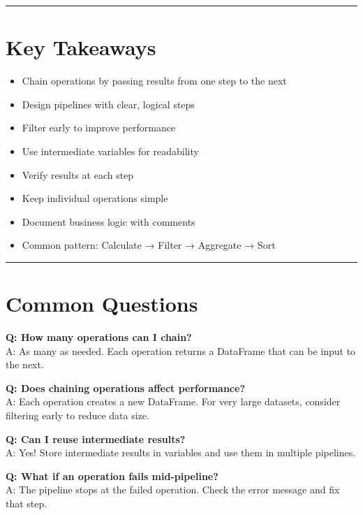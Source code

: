 \documentclass[
  letterpaper,
]{scrbook}
\providecommand{\tightlist}{%
  \setlength{\itemsep}{0pt}\setlength{\parskip}{0pt}}
\begin{document}
\begin{center}\rule{0.5\linewidth}{0.5pt}\end{center}

\section{Key Takeaways}\label{key-takeaways-9}

\begin{itemize}
\tightlist
\item
  Chain operations by passing results from one step to the next
\item
  Design pipelines with clear, logical steps
\item
  Filter early to improve performance
\item
  Use intermediate variables for readability
\item
  Verify results at each step
\item
  Keep individual operations simple
\item
  Document business logic with comments
\item
  Common pattern: Calculate → Filter → Aggregate → Sort
\end{itemize}

\begin{center}\rule{0.5\linewidth}{0.5pt}\end{center}

\section{Common Questions}\label{common-questions-9}

\textbf{Q: How many operations can I chain?}\\
A: As many as needed. Each operation returns a DataFrame that can be
input to the next.

\textbf{Q: Does chaining operations affect performance?}\\
A: Each operation creates a new DataFrame. For very large datasets,
consider filtering early to reduce data size.

\textbf{Q: Can I reuse intermediate results?}\\
A: Yes! Store intermediate results in variables and use them in multiple
pipelines.

\textbf{Q: What if an operation fails mid-pipeline?}\\
A: The pipeline stops at the failed operation. Check the error message
and fix that step.
\end{document}
